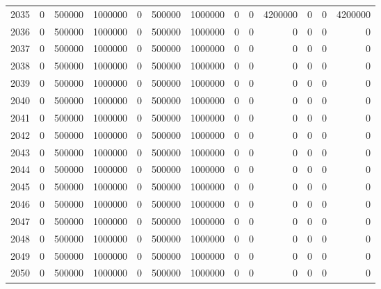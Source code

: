 \begin{table}
\begin{tabular}{lrrrrrrrrrrrr}
2035 & 0 & 500000 & 1000000 & 0 & 500000 & 1000000 & 0 & 0 & 4200000 & 0 & 0 & 4200000 \\
2036 & 0 & 500000 & 1000000 & 0 & 500000 & 1000000 & 0 & 0 & 0 & 0 & 0 & 0 \\
2037 & 0 & 500000 & 1000000 & 0 & 500000 & 1000000 & 0 & 0 & 0 & 0 & 0 & 0 \\
2038 & 0 & 500000 & 1000000 & 0 & 500000 & 1000000 & 0 & 0 & 0 & 0 & 0 & 0 \\
2039 & 0 & 500000 & 1000000 & 0 & 500000 & 1000000 & 0 & 0 & 0 & 0 & 0 & 0 \\
2040 & 0 & 500000 & 1000000 & 0 & 500000 & 1000000 & 0 & 0 & 0 & 0 & 0 & 0 \\
2041 & 0 & 500000 & 1000000 & 0 & 500000 & 1000000 & 0 & 0 & 0 & 0 & 0 & 0 \\
2042 & 0 & 500000 & 1000000 & 0 & 500000 & 1000000 & 0 & 0 & 0 & 0 & 0 & 0 \\
2043 & 0 & 500000 & 1000000 & 0 & 500000 & 1000000 & 0 & 0 & 0 & 0 & 0 & 0 \\
2044 & 0 & 500000 & 1000000 & 0 & 500000 & 1000000 & 0 & 0 & 0 & 0 & 0 & 0 \\
2045 & 0 & 500000 & 1000000 & 0 & 500000 & 1000000 & 0 & 0 & 0 & 0 & 0 & 0 \\
2046 & 0 & 500000 & 1000000 & 0 & 500000 & 1000000 & 0 & 0 & 0 & 0 & 0 & 0 \\
2047 & 0 & 500000 & 1000000 & 0 & 500000 & 1000000 & 0 & 0 & 0 & 0 & 0 & 0 \\
2048 & 0 & 500000 & 1000000 & 0 & 500000 & 1000000 & 0 & 0 & 0 & 0 & 0 & 0 \\
2049 & 0 & 500000 & 1000000 & 0 & 500000 & 1000000 & 0 & 0 & 0 & 0 & 0 & 0 \\
2050 & 0 & 500000 & 1000000 & 0 & 500000 & 1000000 & 0 & 0 & 0 & 0 & 0 & 0 \\
\bottomrule
\end{tabular}
\end{table}
